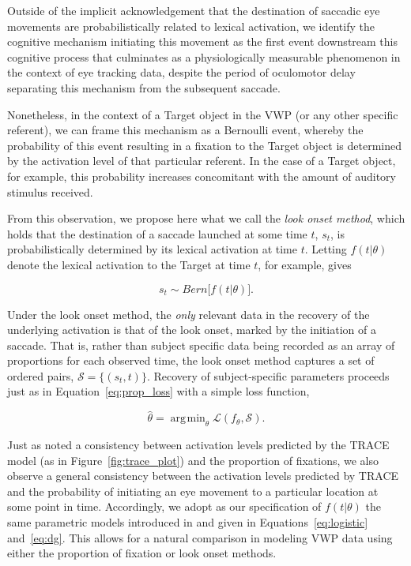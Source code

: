 \documentclass{article}
\DeclareMathOperator*{\argmin}{arg\!\min}
\begin{document}
Outside of the implicit acknowledgement that the destination of saccadic eye movements are probabilistically related to lexical activation, we identify the cognitive mechanism initiating this movement as the first event downstream this cognitive process that culminates as a physiologically measurable phenomenon in the context of eye tracking data, despite the period of oculomotor delay separating this mechanism from the subsequent saccade. 

Nonetheless, in the context of a Target object in the VWP (or any other specific referent), we can frame this mechanism as a Bernoulli event, whereby the probability of this event resulting in a fixation to the Target object is determined by the activation level of that particular referent. In the case of a Target object, for example, this probability increases concomitant with the amount of auditory stimulus received.

From this observation, we propose here what we call the \textit{look onset method}, which holds that the destination of a saccade launched at some time $t$, $s_t$, is probabilistically determined by its lexical activation at time $t$. Letting $f(t|\theta)$ denote the lexical activation to the Target at time $t$, for example, gives

\begin{equation}\label{eq:onset_distribution}
s_t \sim Bern \big[ f( t  |  \theta) \big].
\end{equation}

Under the look onset method, the \textit{only} relevant data in the recovery of the underlying activation is that of the look onset, marked by the initiation of a saccade. That is, rather than subject specific data being recorded as an array of proportions for each observed time, the look onset method captures a set of ordered pairs, $\mathcal{S} = \{(s_t, t)\}$. Recovery of subject-specific parameters proceeds just as in Equation~\ref{eq:prop_loss} with  a simple loss function,

\begin{equation}
\hat{\theta} = \argmin_{\theta} \mathcal{L}(f_{\theta}, \mathcal{S}).
\end{equation}


Just as \citet{allopenna1998tracking} noted a consistency between activation levels predicted by the TRACE model (as in Figure~\ref{fig:trace_plot}) and the proportion of fixations, we also observe a general consistency between the activation levels predicted by TRACE and the probability of initiating an eye movement to a particular location at some point in time. Accordingly, we adopt as our specification of $f(t|\theta)$ the same parametric models introduced in \citet{mcmurray2010individual} and given in Equations~\ref{eq:logistic} and~\ref{eq:dg}. This allows for a natural comparison in modeling VWP data using either the proportion of fixation or look onset methods.
\end{document}
